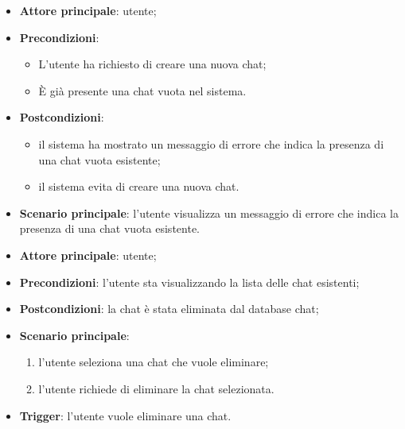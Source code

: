 \documentclass[10pt, a4paper]{article}
\begin{document}
    \begin{itemize}
        \item \textbf{Attore principale}: utente;
        \item \textbf{Precondizioni}:
        \begin{itemize}
            \item L’utente ha richiesto di creare una nuova chat;
            \item È già presente una chat vuota nel sistema.
        \end{itemize}
        \item \textbf{Postcondizioni}:
        \begin{itemize}
            \item il sistema ha mostrato un messaggio di errore che indica la presenza di una chat vuota esistente;
            \item il sistema evita di creare una nuova chat.
        \end{itemize}
        \item \textbf{Scenario principale}: l’utente visualizza un messaggio di errore che indica la presenza di una chat vuota esistente.
    \end{itemize}

    \begin{itemize}
        \item \textbf{Attore principale}: utente;
        \item \textbf{Precondizioni}: l’utente sta visualizzando la lista delle chat esistenti;
        \item \textbf{Postcondizioni}: la chat è stata eliminata dal database chat;
        \item \textbf{Scenario principale}:
        \begin{enumerate}
            \item l’utente seleziona una chat che vuole eliminare;
            \item l’utente richiede di eliminare la chat selezionata.
        \end{enumerate}
        \item \textbf{Trigger}: l’utente vuole eliminare una chat.
    \end{itemize}
\end{document}
